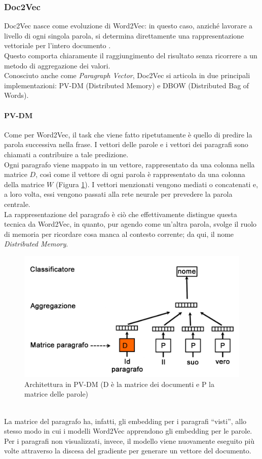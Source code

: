 \documentclass[12pt]{report}
\theoremstyle{definition}
\begin{document}
\subsubsection{Doc2Vec} \label{d2v}
Doc2Vec nasce come evoluzione di Word2Vec: in questo caso, anziché lavorare a livello di ogni singola parola, si determina direttamente una rappresentazione vettoriale per l'intero documento \cite{24}.
\\
Questo comporta chiaramente il raggiungimento del risultato senza ricorrere a un metodo di aggregazione dei valori.
\\
Conosciuto anche come \textit{Paragraph Vector}, Doc2Vec si articola in due principali implementazioni: PV-DM (Distributed Memory) e DBOW (Distributed Bag of Words).

\paragraph{PV-DM} 
Come per Word2Vec, il task che viene fatto ripetutamente è quello di predire la parola successiva nella frase. I vettori delle parole e i vettori dei paragrafi sono chiamati a contribuire a tale predizione.
\\
Ogni paragrafo viene mappato in un vettore, rappresentato da una colonna nella matrice $D$, così come il vettore di ogni parola è rappresentato da una colonna della matrice $W$ (Figura \ref{pvdm}). I vettori menzionati vengono mediati o concatenati e, a loro volta, essi vengono passati alla rete neurale per prevedere la parola centrale.
\\
La rappresentazione del paragrafo è ciò che effettivamente distingue questa tecnica da Word2Vec, in quanto, pur agendo come un'altra parola, svolge il ruolo di memoria per ricordare cosa manca al contesto corrente; da qui, il nome \textit{Distributed Memory}.
\\
\begin{figure}
    \centering
    \includegraphics[scale = 0.3]{images/pvdm.png}
    \caption{Architettura in PV-DM (D è la matrice dei documenti e P la matrice delle parole)}
    \label{pvdm}
\end{figure}
\\
La matrice del paragrafo ha, infatti, gli embedding per i paragrafi ``visti'', allo stesso modo in cui i modelli Word2Vec apprendono gli embedding per le parole. Per i paragrafi non visualizzati, invece, il modello viene nuovamente eseguito più volte attraverso la discesa del gradiente per generare un vettore del documento. 
\end{document}
